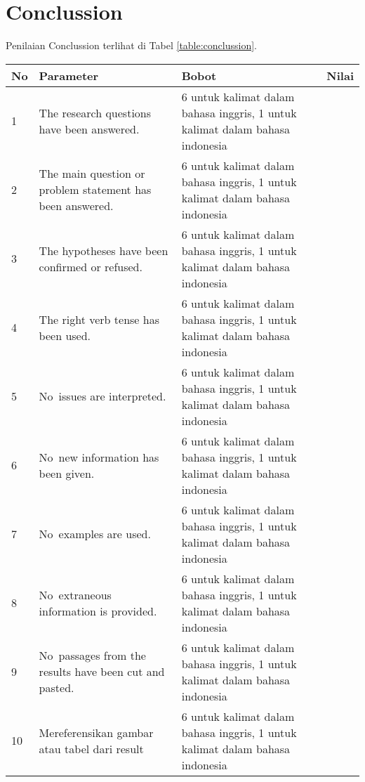 \section{Conclussion}

Penilaian Conclussion terlihat di Tabel \ref{table:conclussion}.
\begin{longtable}{|p{}|p{}|p{}|p{}|}
\hline
No&Parameter&Bobot&Nilai\\
\hline

1 &The research questions have been answered. & 6 untuk kalimat dalam bahasa inggris, 1 untuk kalimat dalam bahasa indonesia & \\ \hline

2 &The main question or problem statement has been answered. & 6 untuk kalimat dalam bahasa inggris, 1 untuk kalimat dalam bahasa indonesia & \\ \hline

3 &The hypotheses have been confirmed or refused. & 6 untuk kalimat dalam bahasa inggris, 1 untuk kalimat dalam bahasa indonesia & \\ \hline

4 &The right verb tense has been used. & 6 untuk kalimat dalam bahasa inggris, 1 untuk kalimat dalam bahasa indonesia & \\ \hline

5 &No issues are interpreted. & 6 untuk kalimat dalam bahasa inggris, 1 untuk kalimat dalam bahasa indonesia & \\ \hline

6 &No new information has been given. & 6 untuk kalimat dalam bahasa inggris, 1 untuk kalimat dalam bahasa indonesia & \\ \hline

7 &No examples are used.& 6 untuk kalimat dalam bahasa inggris, 1 untuk kalimat dalam bahasa indonesia & \\ \hline

8 &No extraneous information is provided. & 6 untuk kalimat dalam bahasa inggris, 1 untuk kalimat dalam bahasa indonesia & \\ \hline

9 &No passages from the results have been cut and pasted. & 6 untuk kalimat dalam bahasa inggris, 1 untuk kalimat dalam bahasa indonesia & \\ \hline

10 &Mereferensikan gambar atau tabel dari result & 6 untuk kalimat dalam bahasa inggris, 1 untuk kalimat dalam bahasa indonesia & \\ \hline


\end{longtable}
